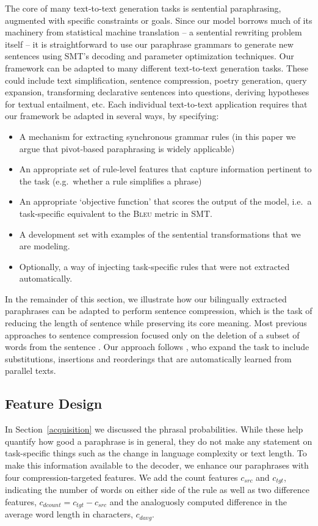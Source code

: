 \documentclass[11pt]{article}
\begin{document}
The core of many text-to-text generation tasks is sentential
paraphrasing, augmented with specific constraints or goals. Since our
model borrows much of its machinery from statistical machine
translation -- a sentential rewriting problem itself -- it is
straightforward to use our paraphrase grammars to generate new
sentences using SMT's decoding and parameter optimization
techniques. Our framework can be adapted to many different
text-to-text generation tasks.  These could include text
simplification, sentence compression, poetry generation, query
expansion, transforming declarative sentences into questions, deriving
hypotheses for textual entailment, etc.  Each individual text-to-text
application requires that our framework be adapted in several ways, by
specifying:
\begin{itemize}
\item A mechanism for extracting synchronous grammar rules (in this
  paper we argue that pivot-based paraphrasing is widely applicable)
\item An appropriate set of rule-level features that capture
  information pertinent to the task (e.g.\ whether a rule simplifies a
  phrase)
\item An appropriate `objective function' that scores the output of
  the model, i.e.\ a task-specific equivalent to the \textsc{Bleu}
  metric in SMT.
\item A development set with examples of the sentential
  transformations that we are modeling.
\item Optionally, a way of injecting task-specific rules that were not
  extracted automatically.
\end{itemize} 
In the remainder of this section, we illustrate how our bilingually
extracted paraphrases can be adapted to perform sentence compression,
which is the task of reducing the length of sentence while preserving
its core meaning.  Most previous approaches to sentence compression
focused only on the deletion of a subset of words from the sentence
\cite{KnightMarcuAI02}.  Our approach follows
, who expand the task to include
substitutions, insertions and reorderings that are automatically
learned from parallel texts.

\subsection{Feature Design}
In Section~\ref{acquisition} we discussed the phrasal
probabilities. While these help quantify how good a paraphrase is in
general, they do not make any statement on task-specific things such
as the change in language complexity or text length. To make this
information available to the decoder, we enhance our paraphrases with
four compression-targeted features. We add the count features
$c_{\mathit{src}}$ and $c_{\mathit{tgt}}$, indicating the number of
words on either side of the rule as well as two difference features,
$c_{\mathit{dcount}} = c_{\mathit{tgt}} - c_{\mathit{src}}$ and the
analoguosly computed difference in the average word length in
characters, $c_{\mathit{davg}}$.
\end{document}
